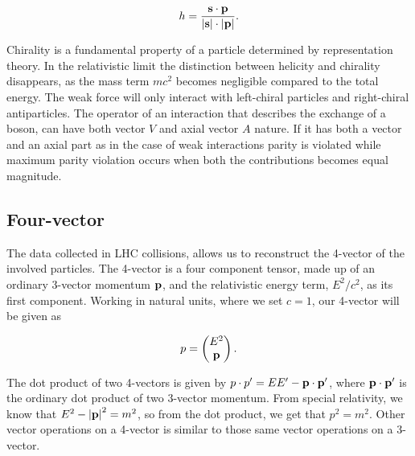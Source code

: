 \documentclass[11pt,a4paper]{article}
\begin{document}
\begin{equation}
h = \frac{\vb s \cdot \vb p}{\abs{\vb s} \cdot \abs{\vb p}}.
\end{equation}

Chirality is a fundamental property of a particle determined by representation theory. In the relativistic limit the distinction between helicity and chirality disappears, as the mass term $mc^2$ becomes negligible compared to the total energy. The weak force will only interact with left-chiral particles and right-chiral antiparticles. The operator of an interaction that describes the exchange of a boson, can have both vector $V$ and axial vector $A$ nature. If it has both a vector and an axial part as in the case of weak interactions parity is violated while maximum parity violation occurs when both the contributions becomes equal magnitude.

\subsection{Four-vector}
The data collected in LHC collisions, allows us to reconstruct the 4-vector of the involved particles. The 4-vector is a four component tensor, made up of an ordinary 3-vector momentum $\vb p$, and the relativistic energy term, $E^2/c^2$, as its first component. Working in natural units, where we set $c=1$, our 4-vector will be given as

\begin{equation}
p = \left(\begin{matrix} E^2 \\ \vb p \end{matrix} \right).
\end{equation}

The dot product of two 4-vectors is given by $p\cdot p' = E E' - \vb p \cdot \vb{p'}$, where $\vb p \cdot \vb{p'}$ is the ordinary dot product of two 3-vector momentum. From special relativity, we know that $E^2 - \abs{\vb p}^2 = m^2$, so from the dot product, we get that $p^2 = m^2$. Other vector operations on a 4-vector is similar to those same vector operations on a 3-vector.
\end{document}
